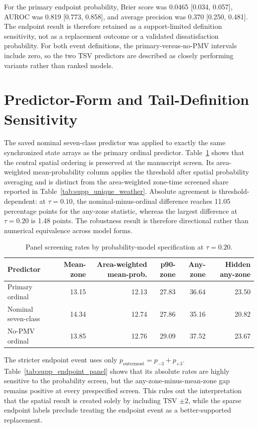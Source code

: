 \documentclass[11pt]{article}
\begin{document}
For the primary endpoint probability, Brier score was 0.0465 [0.034, 0.057], AUROC was 0.819 [0.773, 0.858], and average precision was 0.370 [0.250, 0.481]. The endpoint result is therefore retained as a support-limited definition sensitivity, not as a replacement outcome or a validated dissatisfaction probability. For both event definitions, the primary-versus-no-PMV intervals include zero, so the two TSV predictors are described as closely performing variants rather than ranked models.

\section{Predictor-Form and Tail-Definition Sensitivity}

The saved nominal seven-class predictor was applied to exactly the same synchronized state arrays as the primary ordinal predictor. Table~\ref{tab:supp_model_form_panel} shows that the central spatial ordering is preserved at the manuscript screen. Its area-weighted mean-probability column applies the threshold after spatial probability averaging and is distinct from the area-weighted zone-time screened share reported in Table~\ref{tab:supp_unique_weather}. Absolute agreement is threshold-dependent: at $\tau=0.10$, the nominal-minus-ordinal difference reaches 11.05 percentage points for the any-zone statistic, whereas the largest difference at $\tau=0.20$ is 1.48 points. The robustness result is therefore directional rather than numerical equivalence across model forms.

\begin{table}[htbp]
\centering
\caption{Panel screening rates by probability-model specification at $\tau=0.20$.}
\label{tab:supp_model_form_panel}
\footnotesize
\begin{tabular}{lrrrrr}
\toprule
Predictor & Mean-zone & Area-weighted mean-prob. & p90-zone & Any-zone & Hidden any-zone \\
\midrule
Primary ordinal & 13.15 & 12.13 & 27.83 & 36.64 & 23.50 \\
Nominal seven-class & 14.34 & 12.74 & 27.86 & 35.16 & 20.82 \\
No-PMV ordinal & 13.85 & 12.76 & 29.09 & 37.52 & 23.67 \\
\bottomrule
\end{tabular}
\end{table}

The stricter endpoint event uses only \(p_{\mathrm{outermost}}=p_{-3}+p_{+3}\). Table~\ref{tab:supp_endpoint_panel} shows that its absolute rates are highly sensitive to the probability screen, but the any-zone-minus-mean-zone gap remains positive at every prespecified screen. This rules out the interpretation that the spatial result is created solely by including TSV $\pm2$, while the sparse endpoint labels preclude treating the endpoint event as a better-supported replacement.
\end{document}
